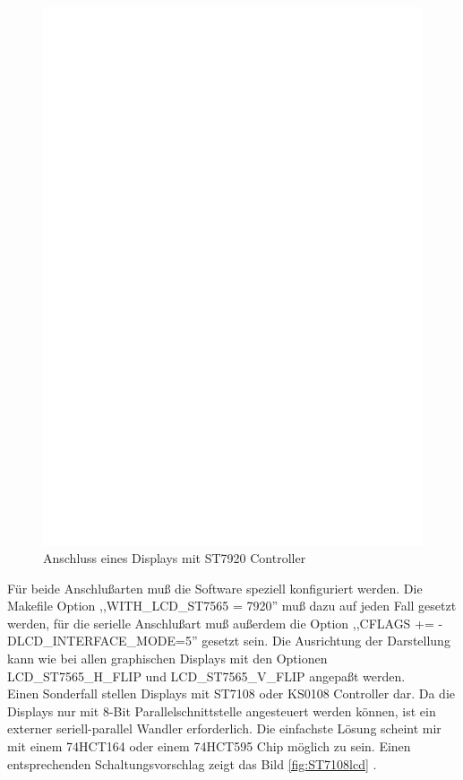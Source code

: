 \begin{figure}[H]
\centering
\includegraphics[width=14cm]{../FIG/ST7920interface.eps}
\caption{Anschluss eines Displays mit ST7920 Controller}
\label{fig:ST7920lcd}
\end{figure}

Für beide Anschlußarten muß die Software speziell konfiguriert werden. 
Die Makefile Option ,,WITH\_LCD\_ST7565 = 7920'' muß dazu auf jeden Fall gesetzt werden, für die serielle
Anschlußart muß außerdem die Option ,,CFLAGS += -DLCD\_INTERFACE\_MODE=5'' gesetzt sein.
Die Ausrichtung der Darstellung kann wie bei allen graphischen Displays  mit den Optionen
LCD\_ST7565\-\_H\_FLIP und LCD\_ST7565\-\_V\_FLIP angepaßt werden. \\

Einen Sonderfall stellen Displays mit ST7108 oder KS0108 Controller dar. Da die Displays nur mit 8-Bit Parallelschnittstelle
angesteuert werden können, ist ein externer seriell-parallel Wandler erforderlich.
Die einfachste Lösung scheint mir mit einem 74HCT164 oder einem 74HCT595 Chip möglich zu sein.
Einen entsprechenden Schaltungsvorschlag zeigt das Bild \ref{fig:ST7108lcd} .

